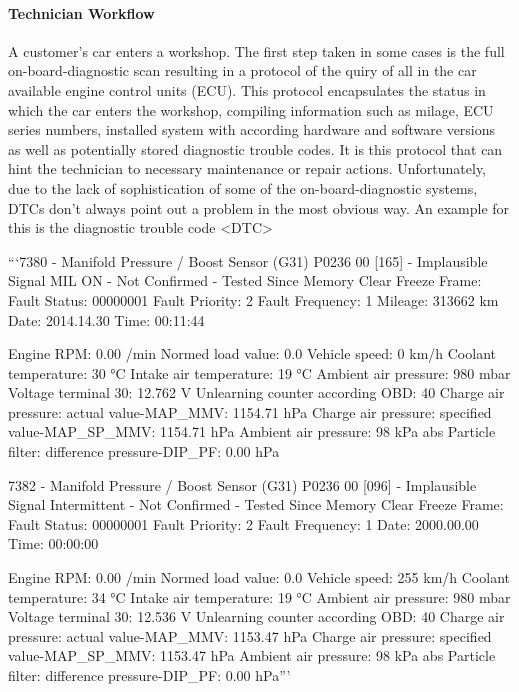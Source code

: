 \paragraph{Technician Workflow}
A customer's car enters a workshop. 
The first step taken in some cases is the full on-board-diagnostic scan resulting in a protocol of the quiry of all in the car available engine control units (ECU). 
This protocol encapsulates the status in which the car enters the workshop, compiling information such as milage, ECU series numbers, installed system with according hardware and software versions as well as potentially stored diagnostic trouble codes.
It is this protocol that can hint the technician to necessary maintenance or repair actions.
Unfortunately, due to the lack of sophistication of some of the on-board-diagnostic systems, DTCs don't always point out a problem in the most obvious way. 
An example for this is the diagnostic trouble code <DTC>

```7380 - Manifold Pressure / Boost Sensor (G31)
P0236 00 [165] - Implausible Signal
MIL ON - Not Confirmed - Tested Since Memory Clear
   Freeze Frame:
          Fault Status: 00000001
          Fault Priority: 2
          Fault Frequency: 1
          Mileage: 313662 km
          Date: 2014.14.30
          Time: 00:11:44

          Engine RPM: 0.00 /min
          Normed load value: 0.0 %
          Vehicle speed: 0 km/h
          Coolant temperature: 30 °C
          Intake air temperature: 19 °C
          Ambient air pressure: 980 mbar
          Voltage terminal 30: 12.762 V
          Unlearning counter according OBD: 40
          Charge air pressure: actual value-MAP_MMV: 1154.71 hPa
          Charge air pressure: specified value-MAP_SP_MMV: 1154.71 hPa
          Ambient air pressure: 98 kPa abs
          Particle filter: difference pressure-DIP_PF: 0.00 hPa

7382 - Manifold Pressure / Boost Sensor (G31)
P0236 00 [096] - Implausible Signal
Intermittent - Not Confirmed - Tested Since Memory Clear
   Freeze Frame:
          Fault Status: 00000001
          Fault Priority: 2
          Fault Frequency: 1
          Date: 2000.00.00
          Time: 00:00:00

          Engine RPM: 0.00 /min
          Normed load value: 0.0 %
          Vehicle speed: 255 km/h
          Coolant temperature: 34 °C
          Intake air temperature: 19 °C
          Ambient air pressure: 980 mbar
          Voltage terminal 30: 12.536 V
          Unlearning counter according OBD: 40
          Charge air pressure: actual value-MAP_MMV: 1153.47 hPa
          Charge air pressure: specified value-MAP_SP_MMV: 1153.47 hPa
          Ambient air pressure: 98 kPa abs
          Particle filter: difference pressure-DIP_PF: 0.00 hPa'''

